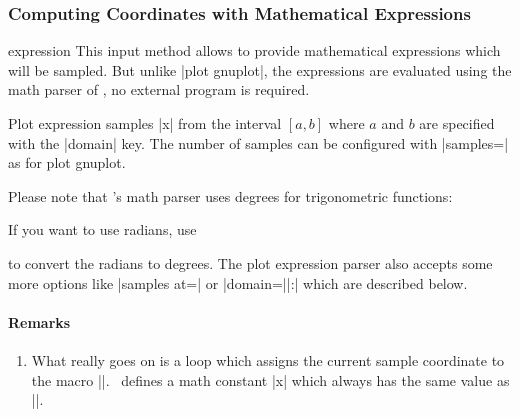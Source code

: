\subsubsection{Computing Coordinates with Mathematical Expressions}

\begin{addplotoperation}[]{expression }{}
	This input method allows to provide mathematical expressions which will be sampled. But unlike |plot gnuplot|, the expressions are evaluated using the math parser of \PGF, no external program is required.

	Plot expression samples |x| from the interval $[a,b]$ where $a$ and $b$ are specified with the |domain| key. The number of samples can be configured with |samples=| as for plot gnuplot.

\begin{codeexample}[]
\end{codeexample}

Please note that \PGF's math parser uses degrees for trigonometric functions:
\begin{codeexample}[]
\end{codeexample}
\noindent If you want to use radians, use 
\begin{codeexample}[]
\end{codeexample}
\noindent to convert the radians to degrees. The plot expression parser also accepts some more options like |samples at=| or |domain=||:| which are described below.

\paragraph{Remarks}
\begin{enumerate} 
	\item What really goes on is a loop which assigns the current sample coordinate to the macro |\x|. \PGFPlots\ defines a math constant |x| which always has the same value as |\x|.


\end{enumerate}
\end{addplotoperation}
